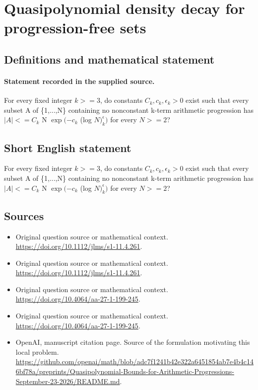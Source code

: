 \documentclass[11pt]{article}
\begin{document}
\section*{Quasipolynomial density decay for progression-free sets}\label{30007102}
\subsection{Definitions and mathematical statement}
\paragraph{Statement recorded in the supplied source.}
For every fixed integer $k>=3$, do constants $C_k,c_k,\epsilon _k>0$ exist such that every subset A of \{1,...,N\} containing no nonconstant k-term arithmetic progression has $|A|<=C_k$ N $\exp (-c_k$ (log $N)^\epsilon _k)$ for every $N>=2$?
\subsection{Short English statement}
For every fixed integer $k>=3$, do constants $C_k,c_k,\epsilon _k>0$ exist such that every subset A of \{1,...,N\} containing no nonconstant k-term arithmetic progression has $|A|<=C_k$ N $\exp (-c_k$ (log $N)^\epsilon _k)$ for every $N>=2$?
\subsection{Sources}
\begin{itemize}
\item[S1] Original question source or mathematical context.
\url{https://doi.org/10.1112/jlms/s1-11.4.261}.
\item[S2] Original question source or mathematical context.
\url{https://doi.org/10.1112/jlms/s1-11.4.261}.
\item[S3] Original question source or mathematical context.
\url{https://doi.org/10.4064/aa-27-1-199-245}.
\item[S4] Original question source or mathematical context.
\url{https://doi.org/10.4064/aa-27-1-199-245}.
\item[S5] OpenAI, manuscript citation page. Source of the formulation motivating this local problem.
\url{https://github.com/openai/math/blob/adc7f1241b42e322a6451854ab7e4b4c146bf78a/preprints/Quasipolynomial-Bounds-for-Arithmetic-Progressions-September-23-2026/README.md}.
\end{itemize}
\end{document}
